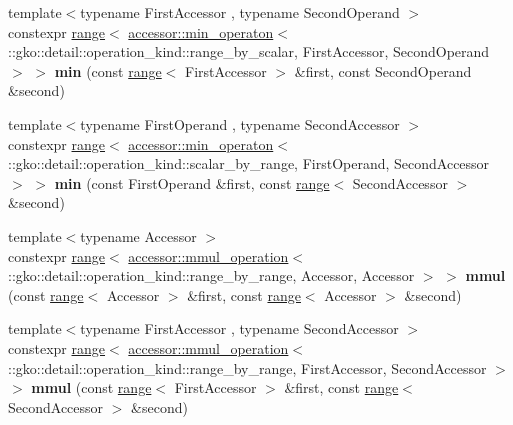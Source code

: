 \begin{DoxyCompactItemize}
\item 
\mbox{\label{namespacegko_ac71f6df883e89643ce21f8adbb2ce07e}} 
{\footnotesize template$<$typename First\+Accessor , typename Second\+Operand $>$ }\\constexpr \hyperlink{classgko_1_1range}{range}$<$ \hyperlink{structgko_1_1accessor_1_1min__operaton}{accessor\+::min\+\_\+operaton}$<$ \+::gko\+::detail\+::operation\+\_\+kind\+::range\+\_\+by\+\_\+scalar, First\+Accessor, Second\+Operand $>$ $>$ {\bfseries min} (const \hyperlink{classgko_1_1range}{range}$<$ First\+Accessor $>$ \&first, const Second\+Operand \&second)
\item 
\mbox{\label{namespacegko_af612eba2f92e21c5809701a80864565d}} 
{\footnotesize template$<$typename First\+Operand , typename Second\+Accessor $>$ }\\constexpr \hyperlink{classgko_1_1range}{range}$<$ \hyperlink{structgko_1_1accessor_1_1min__operaton}{accessor\+::min\+\_\+operaton}$<$ \+::gko\+::detail\+::operation\+\_\+kind\+::scalar\+\_\+by\+\_\+range, First\+Operand, Second\+Accessor $>$ $>$ {\bfseries min} (const First\+Operand \&first, const \hyperlink{classgko_1_1range}{range}$<$ Second\+Accessor $>$ \&second)
\item 
\mbox{\label{namespacegko_af25a3968d03816b31d07e8f45499796d}} 
{\footnotesize template$<$typename Accessor $>$ }\\constexpr \hyperlink{classgko_1_1range}{range}$<$ \hyperlink{structgko_1_1accessor_1_1mmul__operation}{accessor\+::mmul\+\_\+operation}$<$ \+::gko\+::detail\+::operation\+\_\+kind\+::range\+\_\+by\+\_\+range, Accessor, Accessor $>$ $>$ {\bfseries mmul} (const \hyperlink{classgko_1_1range}{range}$<$ Accessor $>$ \&first, const \hyperlink{classgko_1_1range}{range}$<$ Accessor $>$ \&second)
\item 
\mbox{\label{namespacegko_a821da786ceea22fbd7b3c259feef2ac2}} 
{\footnotesize template$<$typename First\+Accessor , typename Second\+Accessor $>$ }\\constexpr \hyperlink{classgko_1_1range}{range}$<$ \hyperlink{structgko_1_1accessor_1_1mmul__operation}{accessor\+::mmul\+\_\+operation}$<$ \+::gko\+::detail\+::operation\+\_\+kind\+::range\+\_\+by\+\_\+range, First\+Accessor, Second\+Accessor $>$ $>$ {\bfseries mmul} (const \hyperlink{classgko_1_1range}{range}$<$ First\+Accessor $>$ \&first, const \hyperlink{classgko_1_1range}{range}$<$ Second\+Accessor $>$ \&second)

\end{DoxyCompactItemize}
